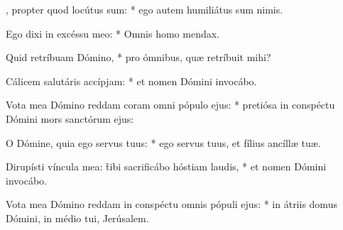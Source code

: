 \begin{psalmus}
    
    , propter quod locútus sum: * ego autem humiliátus sum nimis.
    
    Ego dixi in excéssu meo: * Omnis homo mendax.
    
    Quid retríbuam Dómino, * pro ómnibus, quæ retríbuit mihi?
    
    Cálicem salutáris accípjam: * et nomen Dómini invocábo.
    
    Vota mea Dómino reddam coram omni pópulo ejus: * pretiósa in conspéctu Dómini mors sanctórum ejus:
    
    O Dómine, quia ego servus tuus: * ego servus tuus, et fílius ancíllæ tuæ.
    
    Dirupísti víncula mea: \f tibi sacrificábo hóstiam laudis, * et nomen Dómini invocábo.
    
    Vota mea Dómino reddam in conspéctu omnis pópuli ejus: * in átriis domus Dómini, in médio tui, Jerúsalem.
    
    \end{psalmus}
